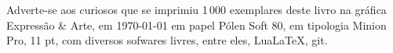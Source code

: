 \pagebreak


\ifodd\thepage\blankpage\fi

\mbox{}\vfill
\thispagestyle{empty}

\begin{center}
		\begin{minipage}{.7\textwidth}\tiny\noindent{}
		\centering\tiny
		Adverte-se aos curiosos que se imprimiu 1\,000 exemplares 
		deste livro na gráfica Expressão \& Arte, 
		em \today{} em papel Pólen Soft 80, em tipologia 
		Minion Pro, 11 pt, 
		com diversos sofwares livres, 
		entre eles, Lua\LaTeX, git.\\ 
		\medskip\\\
		\end{minipage}
\end{center}